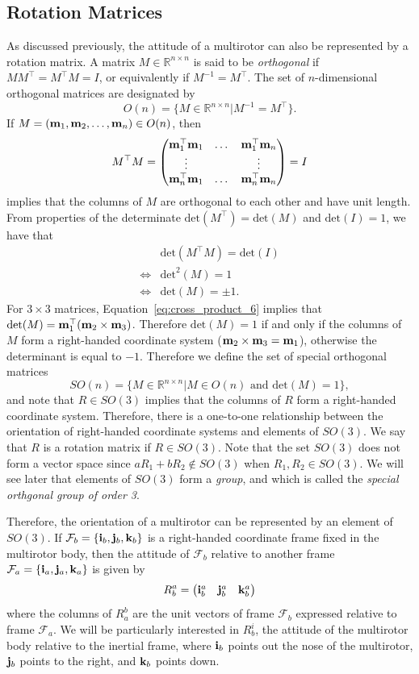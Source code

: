 \subsection{Rotation Matrices}

As discussed previously, the attitude of a multirotor can also be represented by a rotation matrix.
A matrix $M\in\mathbb{R}^{n\times n}$ is said to be {\em orthogonal} if $MM^\top = M^\top M=I$, or equivalently if $M^{-1} = M^\top$.  The set of $n$-dimensional orthogonal matrices are designated by 
\[
O(n) = \{ M\in\mathbb{R}^{n\times n} | M^{-1}=M^\top \}.
\]
If $M=(\mathbf{m}_1, \mathbf{m}_2, \dots, \mathbf{m}_n)\in O(n)$, then 
\[
M^\top M =\begin{pmatrix} \mathbf{m}_1^\top \mathbf{m}_1 & \dots & \mathbf{m}_1^\top \mathbf{m}_n \\
\vdots & & \vdots \\
\mathbf{m}_n^\top \mathbf{m}_1 & \dots & \mathbf{m}_n^\top \mathbf{m}_n \end{pmatrix}=I
\]
implies that the columns of $M$ are orthogonal to each other and have unit length.  From properties of the determinate $\text{det}(M^\top)=\text{det}(M)$ and $\text{det}(I)=1$, we have that
\begin{align*}
& \text{det}(M^\top M) = \text{det}(I) \\
\iff & \text{det}^2(M) = 1 \\
\iff & \text{det}(M) = \pm 1.	
\end{align*}
For $3\times 3$ matrices, Equation~\eqref{eq:cross_product_6} implies that $\text{det}(M)=\mathbf{m}_1^\top(\mathbf{m}_2\times\mathbf{m}_3)$.  Therefore $\text{det}(M)=1$ if and only if the columns of $M$ form a right-handed coordinate system ($\mathbf{m}_2\times\mathbf{m}_3=\mathbf{m}_1$), otherwise the determinant is equal to $-1$.  
Therefore we define the set of special orthogonal matrices 
\[
SO(n) = \{M\in\mathbb{R}^{n\times n} | M\in O(n) \text{~and~} \text{det}(M)=1 \},
\]
and note that $R\in SO(3)$ implies that the columns of $R$ form a right-handed coordinate system.  Therefore, there is a one-to-one relationship between the orientation of right-handed coordinate systems and elements of $SO(3)$.  We say that $R$ is a rotation matrix if $R\in SO(3)$.  Note that the set $SO(3)$ does not form a vector space since $aR_1+bR_2\not\in SO(3)$ when $R_1,R_2\in SO(3)$.  We will see later that elements of $SO(3)$ form a {\em group}, and which is called the {\em special orthgonal group of order 3}.

Therefore, the orientation of a multirotor can be represented by an element of $SO(3)$.  If $\mathcal{F}_b = \{\mathbf{i}_b, \mathbf{j}_b, \mathbf{k}_b\}$ is a right-handed coordinate frame fixed in the multirotor body, then the attitude of $\mathcal{F}_b$ relative to another frame $\mathcal{F}_a = \{\mathbf{i}_a, \mathbf{j}_a, \mathbf{k}_a\}$ is given by
\[
R_b^a = \begin{pmatrix} \mathbf{i}_b^a & \mathbf{j}_b^a & \mathbf{k}_b^a \end{pmatrix}
\]
where the columns of $R_a^b$ are the unit vectors of frame $\mathcal{F}_b$ expressed relative to frame $\mathcal{F}_a$.  We will be particularly interested in $R_b^i$, the attitude of the multirotor body relative to the inertial frame, where $\mathbf{i}_b$ points out the nose of the multirotor, $\mathbf{j}_b$ points to the right, and $\mathbf{k}_b$ points down.  

